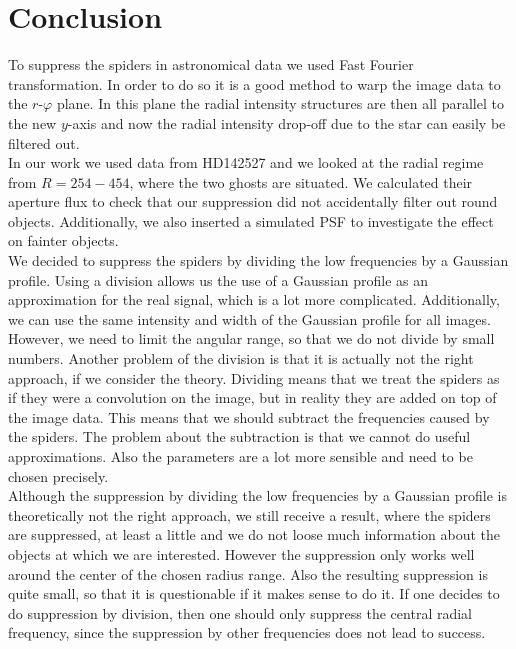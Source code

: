 \section{Conclusion}
\label{sec:conclusion}
To suppress the spiders in astronomical data we used Fast Fourier transformation. In order to do so it is a good method to warp the image data to the $r$-$\varphi$ plane. In this plane the radial intensity structures are then all parallel to the new $y$-axis and now the radial intensity drop-off due to the star can easily be filtered out.\\
In our work we used data from HD142527 and we looked at the radial regime from $R=254-454$, where the two ghosts are situated. We calculated their aperture flux to check that our suppression did not accidentally filter out round objects. Additionally, we also inserted a simulated PSF to investigate the effect on fainter objects. \\
We decided to suppress the spiders by dividing the low frequencies by a Gaussian profile. Using a division allows us the use of a Gaussian profile as an approximation for the real signal, which is a lot more complicated. Additionally, we can use the same intensity and width of the Gaussian profile for all images. \\
However, we need to limit the angular range, so that we do not divide by small numbers. Another problem of the division is that it is actually not the right approach, if we consider the theory. Dividing means that we treat the spiders as if they were a convolution on the image, but in reality they are added on top of the image data. This means that we should subtract the frequencies caused by the spiders. The problem about the subtraction is that we cannot do useful approximations. Also the parameters are a lot more sensible and need to be chosen precisely. \\
Although the suppression by dividing the low frequencies by a Gaussian profile is theoretically not the right approach, we still receive a result, where the spiders are suppressed, at least a little and we do not loose much information about the objects at which we are interested. However the suppression only works well around the center of the chosen radius range. Also the resulting suppression is quite small, so that it is questionable if it makes sense to do it. If one decides to do suppression by division, then one should only suppress the central radial frequency, since the suppression by other frequencies does not lead to success.\\ 
